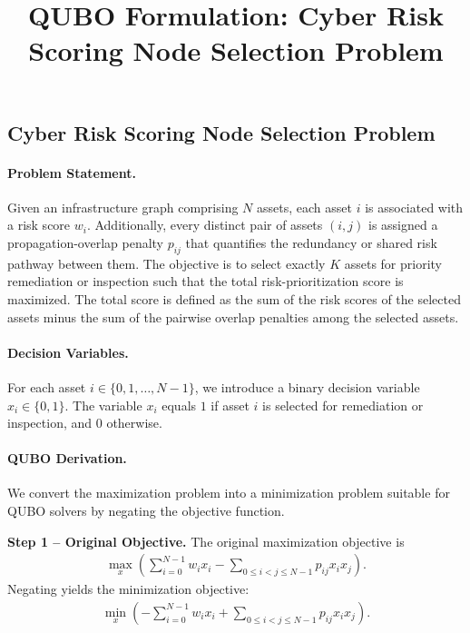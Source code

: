 \documentclass[12pt]{article}
\title{QUBO Formulation: Cyber Risk Scoring Node Selection Problem}
\date{}
\begin{document}
\maketitle

\subsection*{Cyber Risk Scoring Node Selection Problem}

\paragraph{Problem Statement.}
Given an infrastructure graph comprising $N$ assets, each asset $i$ is associated with a risk score $w_i$. Additionally, every distinct pair of assets $(i,j)$ is assigned a propagation-overlap penalty $p_{ij}$ that quantifies the redundancy or shared risk pathway between them. The objective is to select exactly $K$ assets for priority remediation or inspection such that the total risk-prioritization score is maximized. The total score is defined as the sum of the risk scores of the selected assets minus the sum of the pairwise overlap penalties among the selected assets.

\paragraph{Decision Variables.}
For each asset $i \in \{0, 1, \dots, N-1\}$, we introduce a binary decision variable $x_i \in \{0,1\}$. The variable $x_i$ equals $1$ if asset $i$ is selected for remediation or inspection, and $0$ otherwise.

\paragraph{QUBO Derivation.}
We convert the maximization problem into a minimization problem suitable for QUBO solvers by negating the objective function.

\textbf{Step 1 -- Original Objective.}
The original maximization objective is
\begin{align}
    \max_{x} \left( \sum_{i=0}^{N-1} w_i x_i - \sum_{0 \le i < j \le N-1} p_{ij} x_i x_j \right).
\end{align}
Negating yields the minimization objective:
\begin{align}
    \min_{x} \left( -\sum_{i=0}^{N-1} w_i x_i + \sum_{0 \le i < j \le N-1} p_{ij} x_i x_j \right).
\end{align}
\end{document}
